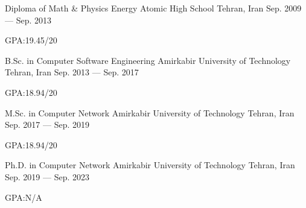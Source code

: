 

\begin{cventries}

  \cventry%
    {Diploma of Math \& Physics} %
    {Energy Atomic High School} %
    {Tehran, Iran} %
    {Sep. 2009 --- Sep. 2013} %
    {%
      \begin{cvitems} %
        \item {GPA:\@ 19.45/20}
      \end{cvitems}
    }


  \cventry%
    {B.Sc. in Computer Software Engineering} %
    {Amirkabir University of Technology} %
    {Tehran, Iran} %
    {Sep. 2013 --- Sep. 2017} %
    {%
      \begin{cvitems} %
        \item {GPA:\@ 18.94/20}
      \end{cvitems}
    }


  \cventry%
    {M.Sc. in Computer Network} %
    {Amirkabir University of Technology} %
    {Tehran, Iran} %
    {Sep. 2017 --- Sep. 2019} %
    {%
      \begin{cvitems} %
        \item {GPA:\@ 18.94/20}
      \end{cvitems}
    }


  \cventry%
    {Ph.D. in Computer Network} %
    {Amirkabir University of Technology} %
    {Tehran, Iran} %
    {Sep. 2019 --- Sep. 2023} %
    {%
      \begin{cvitems} %
        \item {GPA:\@ N/A}
      \end{cvitems}
    }


\end{cventries}
